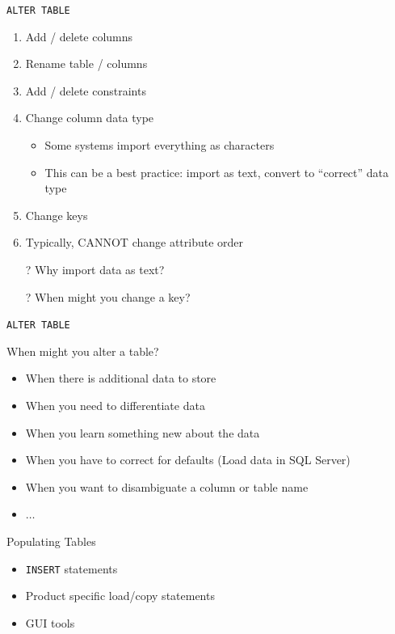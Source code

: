\documentclass[aspectratio=169]{beamer}
\begin{document}
\begin{frame}{\texttt{ALTER TABLE}}

\begin{enumerate}
\item Add / delete columns
\item Rename table / columns
\item Add / delete constraints
\item Change column data type
\begin{itemize}
\item Some systems import everything as characters
\item This can be a best practice: import as text, convert to ``correct'' data type
\end{itemize}
\item Change keys
\item Typically, CANNOT change attribute order
\end{enumerate}

\begin{itemize}
\item[?] Why import data as text?
\item[?] When might you change a key?
\end{itemize}
\end{frame}

\begin{frame}{\texttt{ALTER TABLE}}

When might you alter a table?
\begin{itemize}
\item When there is additional data to store
\item When you need to differentiate data
\item When you learn something new about the data
\item When you have to correct for defaults (Load data in SQL Server)
\item When you want to disambiguate a column or table name
\item  $\ldots$
\end{itemize}
\end{frame}

\begin{frame}{Populating Tables}

\begin{itemize}
\item \texttt{INSERT} statements
\item Product specific load/copy statements
\item GUI tools
\end{itemize}
\end{frame}
\end{document}
